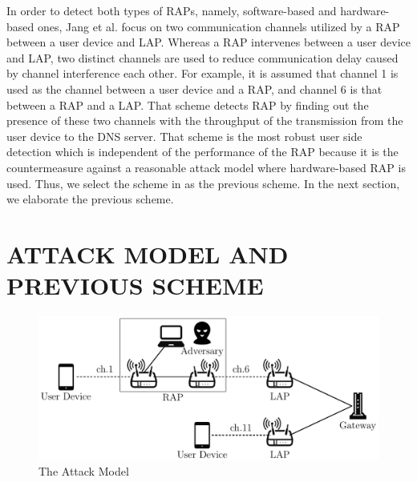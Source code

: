 \documentclass[conference]{IEEEtran}
\begin{document}
In order to detect both types of RAPs, namely, software-based and hardware-based ones, Jang et al. focus on two communication channels utilized by a RAP between a user device and LAP\cite{previous}.
Whereas a RAP intervenes between a user device and LAP, two distinct channels are used to reduce communication delay caused by channel interference each other.
For example, it is assumed that channel 1 is used as the channel between a user device and a RAP, and channel 6 is that between a RAP and a LAP.
That scheme detects RAP by finding out the presence of these two channels with the throughput of the transmission from the user device to the DNS server.
That scheme is the most robust user side detection which is independent of the performance of the RAP because it is the countermeasure against a reasonable attack model where hardware-based RAP is used.
Thus, we select the scheme in \cite{previous} as the previous scheme.
In the next section, we elaborate the previous scheme.

\section{ATTACK MODEL AND PREVIOUS SCHEME}\label{sec:3}
\begin{figure}[t]
    \begin{center}
        \includegraphics[scale=0.4]{attack-model/attack-model.pdf}
        \caption{The Attack Model}
        \label{fig:model}
    \end{center}
\vspace{-2zh}
\end{figure}
\end{document}
